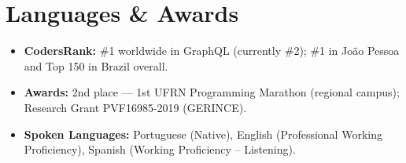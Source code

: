 \documentclass[11pt,a4paper]{article}
\begin{document}
\section{Languages \& Awards}
\begin{itemize}[leftmargin=14pt, itemsep=2pt, topsep=0pt]
    \item \textbf{CodersRank:} \#1 worldwide in GraphQL (currently \#2); \#1 in Jo\~ao Pessoa and Top 150 in Brazil overall.
    \item \textbf{Awards:} 2nd place --- 1st UFRN Programming Marathon (regional campus); Research Grant PVF16985-2019 (GERINCE).
    \item \textbf{Spoken Languages:} Portuguese (Native), English (Professional Working Proficiency), Spanish (Working Proficiency -- Listening).
\end{itemize}
\end{document}
